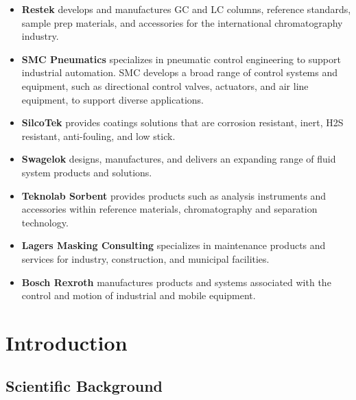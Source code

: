 \documentclass[a4paper,12pt,twoside]{article}
\begin{document}
\begin{itemize}
  \item \textbf{Restek} develops and manufactures GC and LC columns, reference standards, sample prep materials, and accessories for the international chromatography industry. 
  \item \textbf{SMC Pneumatics} specializes in pneumatic control engineering to support industrial automation. SMC develops a broad range of control systems and equipment, such as directional control valves, actuators, and air line equipment, to support diverse applications.
  \item \textbf{SilcoTek} provides coatings solutions that are corrosion resistant, inert, H2S resistant, anti-fouling, and low stick.
  \item \textbf{Swagelok} designs, manufactures, and delivers an expanding range of fluid system products and solutions.
  \item \textbf{Teknolab Sorbent} provides products such as  analysis instruments and accessories within reference materials, chromatography and separation technology.
  \item \textbf{Lagers Masking Consulting} specializes in maintenance products and services for industry, construction, and municipal facilities.
  \item \textbf{Bosch Rexroth} manufactures products and systems associated with the control and motion of industrial and mobile equipment.
\end{itemize}

\pagestyle{SED}
\raggedbottom  %

%

\section{Introduction}
\subsection{Scientific Background}
\end{document}
